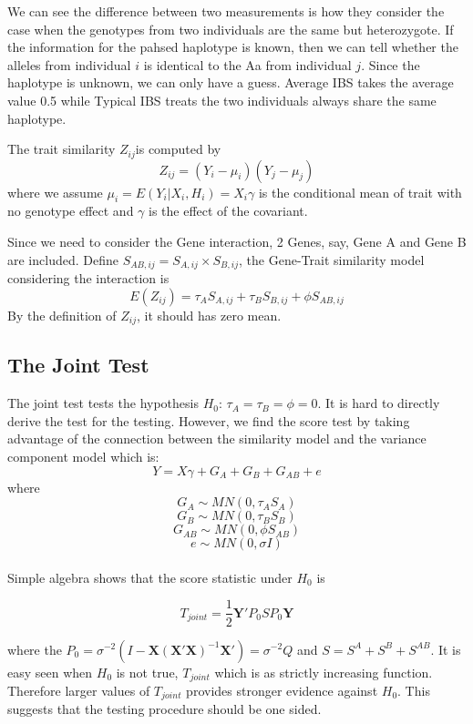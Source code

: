 \documentclass{article}
\newcommand{\Y}{\mathbf{Y}}
\newcommand{\X}{\mathbf{X}}
\begin{document}
         We can see the difference between two measurements is how they consider the case when the genotypes from two individuals are the same but heterozygote. If the information for the pahsed haplotype is known,  then we can tell whether the alleles from individual $i$ is identical to the Aa from individual $j$. Since the haplotype is unknown, we can only have a guess. Average IBS takes the average value 0.5 while Typical IBS treats the two individuals always share the same haplotype.

         The trait similarity $Z_{ij}$is computed by
         \begin{equation*}
            Z_{ij}=(Y_i-\mu_i)(Y_j-\mu_j)
         \end{equation*}
         where we assume $\mu_i=E(Y_i|X_i,H_i)=X_i\gamma$ is the conditional mean of trait with no genotype effect and $\gamma$ is the effect of the covariant.

         Since we need to consider the Gene interaction, 2 Genes, say, Gene A and Gene B are included. Define $S_{AB,ij}=S_{A,ij}\times S_{B,ij}$, the Gene-Trait similarity model considering the interaction is
         \begin{equation*}
            E(Z_{ij})=\tau_AS_{A,ij}+\tau_BS_{B,ij}+\phi S_{AB,ij}
         \end{equation*}
        By the definition of $Z_{ij}$, it should has zero mean.

        \subsection{The Joint Test}
        The joint test tests the hypothesis $H_0$: $\tau_A=\tau_B=\phi=0$. It is hard to directly derive the test for the testing. However, we find the score test by taking advantage of the connection between the similarity model and the variance component model which is:
        \begin{equation*}
            Y=X\gamma+G_A+G_B+G_{AB}+e
        \end{equation*}
        where
        \[G_A   \sim   MN(0, \tau_AS_A)\]
        \[G_B   \sim   MN(0, \tau_BS_B)\]
        \[G_{AB}\sim   MN(0, \phi S_{AB})\]
        \[e     \sim   MN(0,\sigma I)\]\\

        Simple algebra shows that the score statistic under $H_0$ is

        \[
            T_{joint}=\frac{1}{2}\Y'P_0SP_0\Y
        \]

        where the $P_0=\sigma^{-2}(I-\X(\X'\X)^{-1}\X')=\sigma^{-2}Q$ and $S=S^A+S^B+S^{AB}$. It is easy seen when $H_0$ is not true, $T_{joint}$ which is as strictly increasing function. Therefore larger values of $T_{joint}$ provides stronger evidence against $H_0$. This suggests that the testing procedure should be one sided.
\end{document}
